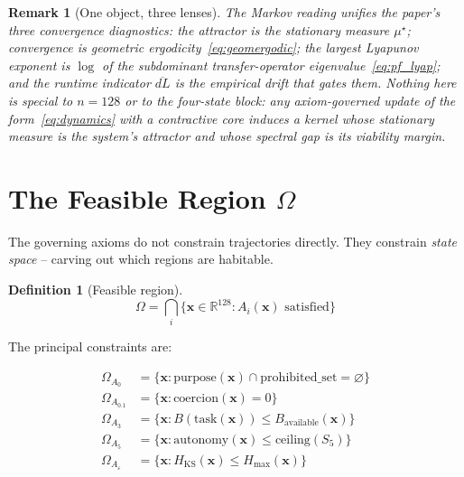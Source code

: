 \documentclass[11pt, a4paper]{article}
\newtheorem{definition}{Definition}
\newtheorem{remark}{Remark}
\newcommand{\R}{\mathbb{R}}
\newcommand{\sv}{\bm{x}}
\begin{document}
\begin{remark}[One object, three lenses]
The Markov reading unifies the paper's three convergence diagnostics: the
\emph{attractor} is the stationary measure $\mu^\star$; \emph{convergence} is
geometric ergodicity~\eqref{eq:geomergodic}; the \emph{largest Lyapunov exponent}
is $\log$ of the subdominant transfer-operator eigenvalue~\eqref{eq:pf_lyap}; and
the runtime indicator $\overline{dL}$ is the empirical drift that gates them.
Nothing here is special to $n=128$ or to the four-state block: any axiom-governed
update of the form~\eqref{eq:dynamics} with a contractive core induces a kernel
whose stationary measure is the system's attractor and whose spectral gap is its
viability margin.
\end{remark}


\section{The Feasible Region $\Omega$}
\label{sec:feasible}

The governing axioms do not constrain trajectories directly.
They constrain \emph{state space} -- carving out which regions are habitable.

\begin{definition}[Feasible region]
\label{def:omega}
\begin{equation}
  \Omega = \bigcap_i \bigl\{ \sv \in \R^{128} : A_i(\sv) \text{ satisfied} \bigr\}
\end{equation}
\end{definition}

The principal constraints are:

\begin{align}
  \Omega_{A_0}       &= \bigl\{ \sv : \mathrm{purpose}(\sv) \cap
                        \mathrm{prohibited\_set} = \varnothing \bigr\}
  \label{eq:a0} \\
  \Omega_{A_{0.1}}   &= \bigl\{ \sv : \mathrm{coercion}(\sv) = 0 \bigr\}
  \label{eq:a01} \\
  \Omega_{A_3}       &= \bigl\{ \sv : B(\mathrm{task}(\sv)) \le B_\text{available}(\sv) \bigr\}
  \label{eq:a3} \\
  \Omega_{A_5}       &= \bigl\{ \sv : \mathrm{autonomy}(\sv) \le \mathrm{ceiling}(S_5) \bigr\}
  \label{eq:a5} \\
  \Omega_{A_\varepsilon} &= \bigl\{ \sv : H_\text{KS}(\sv) \le H_\text{max}(\sv) \bigr\}
  \label{eq:ae}
\end{align}
\end{document}
